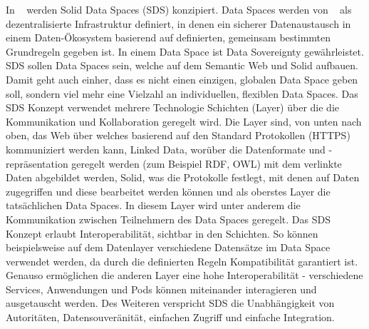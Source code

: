 \documentclass[acmtog]{acmart}
\begin{document}

In ~\cite{meckler2023web} werden Solid Data Spaces (SDS) konzipiert.
Data Spaces werden von ~\cite{nagel2021design} als dezentralisierte Infrastruktur definiert, in denen ein sicherer Datenaustausch in einem Daten-Ökosystem basierend auf definierten, gemeinsam bestimmten Grundregeln gegeben ist. In einem Data Space ist Data Sovereignty gewährleistet.
SDS sollen Data Spaces sein, welche auf dem Semantic Web und Solid aufbauen. Damit geht auch einher, dass es nicht einen einzigen, globalen Data Space geben soll, sondern viel mehr eine Vielzahl an individuellen, flexiblen Data Spaces.
Das SDS Konzept verwendet mehrere Technologie Schichten (Layer) über die die Kommunikation und Kollaboration geregelt wird. Die Layer sind, von unten nach oben, das Web über welches basierend auf den Standard Protokollen (HTTPS) kommuniziert werden kann, Linked Data, worüber die Datenformate und -repräsentation geregelt werden (zum Beispiel RDF, OWL) mit dem verlinkte Daten abgebildet werden, Solid, was die Protokolle festlegt, mit denen auf Daten zugegriffen und diese bearbeitet werden können und als oberstes Layer die tatsächlichen Data Spaces. In diesem Layer wird unter anderem die Kommunikation zwischen Teilnehmern des Data Spaces geregelt. Das SDS Konzept erlaubt Interoperabilität, sichtbar in den Schichten. So können beispielsweise auf dem Datenlayer verschiedene Datensätze im Data Space verwendet werden, da durch die definierten Regeln Kompatibilität garantiert ist. Genauso ermöglichen die anderen Layer eine hohe Interoperabilität - verschiedene Services, Anwendungen und Pods können miteinander interagieren und ausgetauscht werden. Des Weiteren verspricht SDS die Unabhängigkeit von Autoritäten, Datensouveränität, einfachen Zugriff und einfache Integration.
\end{document}
